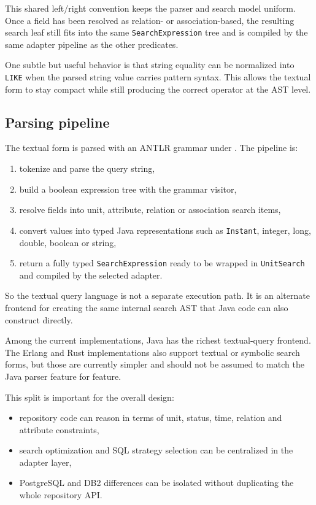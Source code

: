 This shared left/right convention keeps the parser and search model uniform. Once a field has been resolved as relation- or association-based, the resulting search leaf still fits into the same \texttt{SearchExpression} tree and is compiled by the same adapter pipeline as the other predicates.

One subtle but useful behavior is that string equality can be normalized into \texttt{LIKE} when the parsed string value carries pattern syntax. This allows the textual form to stay compact while still producing the correct operator at the AST level.

\subsection{Parsing pipeline}

The textual form is parsed with an ANTLR grammar under . The pipeline is:
\begin{enumerate}
\item tokenize and parse the query string,
\item build a boolean expression tree with the grammar visitor,
\item resolve fields into unit, attribute, relation or association search items,
\item convert values into typed Java representations such as \texttt{Instant}, integer, long, double, boolean or string,
\item return a fully typed \texttt{SearchExpression} ready to be wrapped in \texttt{UnitSearch} and compiled by the selected adapter.
\end{enumerate}

So the textual query language is not a separate execution path. It is an alternate frontend for creating the same internal search AST that Java code can also construct directly.

Among the current implementations, Java has the richest textual-query frontend. The Erlang and Rust implementations also support textual or symbolic search forms, but those are currently simpler and should not be assumed to match the Java parser feature for feature.

This split is important for the overall design:
\begin{itemize}
\item repository code can reason in terms of unit, status, time, relation and attribute constraints,
\item search optimization and SQL strategy selection can be centralized in the adapter layer,
\item PostgreSQL and DB2 differences can be isolated without duplicating the whole repository API.
\end{itemize}

